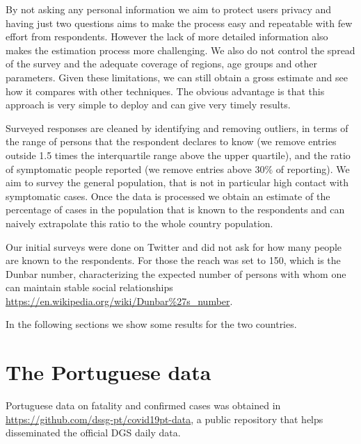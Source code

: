 \documentclass{article}
\begin{document}
By not asking any personal information we aim to protect users privacy and having just two questions aims to make the process easy and repeatable with few effort from respondents. However the lack of more detailed information also makes the estimation process more challenging. We also do not control the spread of the survey and the adequate coverage of regions, age groups and other parameters.
Given these limitations, we can still obtain a gross estimate and see how it compares with other techniques. The obvious advantage is that this approach is very simple to deploy and can give very timely results. 

Surveyed responses are cleaned by identifying and removing outliers, in terms of the range of persons that the respondent declares to know (we remove entries outside 1.5 times the interquartile range above the upper quartile), and the ratio of symptomatic people reported (we remove entries above $30\%$ of reporting). We aim to survey the general population, that is not in particular high contact with symptomatic cases. Once the data is processed we obtain an estimate of the percentage of cases in the population that is known to the respondents and can naively extrapolate this ratio to the whole country population. 


Our initial surveys were done on Twitter and did not ask for how many people are known to the respondents. For those the reach was set to 150, which is the Dunbar number, characterizing the expected number of persons with whom one can maintain stable social relationships \url{https://en.wikipedia.org/wiki/Dunbar%27s_number}. 

In the following sections we show some results for the two countries. 

\section{The Portuguese data}

Portuguese data on fatality and confirmed cases was obtained in \url{https://github.com/dssg-pt/covid19pt-data}, a public repository that helps disseminated the official DGS daily data.
\end{document}
